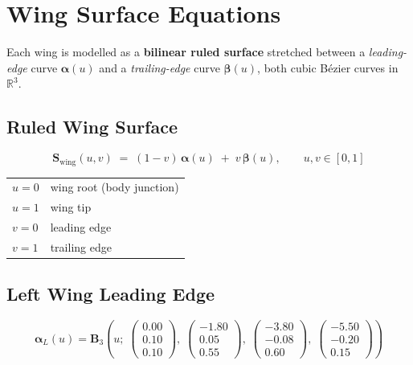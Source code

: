 \documentclass[12pt,a4paper]{article}
\newcommand{\vv}[1]{\bm{#1}}          %
\newcommand{\R}{\mathbb{R}}
\begin{document}
\section{Wing Surface Equations}

Each wing is modelled as a \textbf{bilinear ruled surface} stretched between
a \emph{leading-edge} curve $\vv{\alpha}(u)$ and a \emph{trailing-edge}
curve $\vv{\beta}(u)$, both cubic Bézier curves in $\R^3$.

\subsection{Ruled Wing Surface}
\begin{equation}
  \boxed{
    \vv{S}_{\mathrm{wing}}(u,v)
    \;=\;
    (1-v)\,\vv{\alpha}(u) \;+\; v\,\vv{\beta}(u),
    \qquad u,v\in[0,1]
  }
\end{equation}

\begin{center}
\begin{tabular}{ll}
  $u=0$ & wing root (body junction) \\
  $u=1$ & wing tip \\
  $v=0$ & leading edge \\
  $v=1$ & trailing edge
\end{tabular}
\end{center}

\subsection{Left Wing Leading Edge}
\begin{equation}
  \vv{\alpha}_L(u)
  = \vv{B}_3\!\left(u;\;
    \begin{pmatrix}0.00\\0.10\\0.10\end{pmatrix},\;
    \begin{pmatrix}-1.80\\0.05\\0.55\end{pmatrix},\;
    \begin{pmatrix}-3.80\\-0.08\\0.60\end{pmatrix},\;
    \begin{pmatrix}-5.50\\-0.20\\0.15\end{pmatrix}
  \right)
\end{equation}
\end{document}
